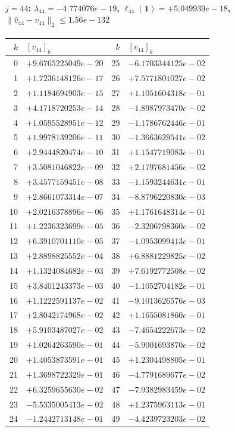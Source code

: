 \documentclass[11pt]{article}
\begin{document}
\paragraph{$j = 44$: $\lambda_{44} = -4.774076e-19$, \quad $\ell_{44}(\mathbf{1}) = +5.049939e-18$, \quad $\|\hat{v}_{44} - v_{44}\|_2 \leq 1.56e-132$}
\begin{center}
{\footnotesize
\begin{tabular}{r@{\;\;}l@{\quad}r@{\;\;}l}
\toprule
$k$ & $[v_{44}]_k$ & $k$ & $[v_{44}]_k$ \\
\midrule
0 & $+9.6765225049e-20$ & 25 & $-6.1703344125e-02$ \\
1 & $+1.7236148126e-17$ & 26 & $+7.5771801027e-02$ \\
2 & $+1.1184694903e-15$ & 27 & $+1.1051604318e-01$ \\
3 & $+4.1718720253e-14$ & 28 & $-1.8987973470e-02$ \\
4 & $+1.0595528951e-12$ & 29 & $-1.1786762446e-01$ \\
5 & $+1.9978139206e-11$ & 30 & $-1.3663629541e-02$ \\
6 & $+2.9444820474e-10$ & 31 & $+1.1547719083e-01$ \\
7 & $+3.5081046822e-09$ & 32 & $+2.1797681456e-02$ \\
8 & $+3.4577159451e-08$ & 33 & $-1.1593244631e-01$ \\
9 & $+2.8661073314e-07$ & 34 & $-8.8796220830e-03$ \\
10 & $+2.0216378896e-06$ & 35 & $+1.1761648314e-01$ \\
11 & $+1.2236323699e-05$ & 36 & $-2.3206798360e-02$ \\
12 & $+6.3910701110e-05$ & 37 & $-1.0953099413e-01$ \\
13 & $+2.8898825552e-04$ & 38 & $+6.8881229825e-02$ \\
14 & $+1.1324084682e-03$ & 39 & $+7.6192772508e-02$ \\
15 & $+3.8401243373e-03$ & 40 & $-1.1052704182e-01$ \\
16 & $+1.1222591137e-02$ & 41 & $-9.1013626576e-03$ \\
17 & $+2.8042174968e-02$ & 42 & $+1.1655081860e-01$ \\
18 & $+5.9103487027e-02$ & 43 & $-7.4654222673e-02$ \\
19 & $+1.0264263590e-01$ & 44 & $-5.9001693870e-02$ \\
20 & $+1.4053873591e-01$ & 45 & $+1.2304498805e-01$ \\
21 & $+1.3698722329e-01$ & 46 & $-4.7791689677e-02$ \\
22 & $+6.3259655630e-02$ & 47 & $-7.9382983459e-02$ \\
23 & $-5.5335005413e-02$ & 48 & $+1.2375963113e-01$ \\
24 & $-1.2442713148e-01$ & 49 & $-4.4239723203e-02$ \\
\bottomrule
\end{tabular}
}
\end{center}
\end{document}
